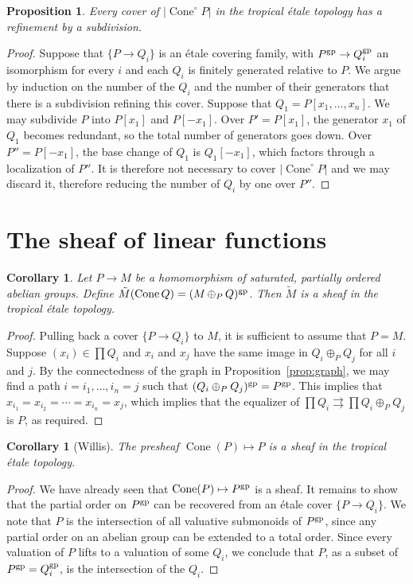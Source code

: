 \documentclass[12pt]{amsart}
\newtheorem{proposition}[theorem]{Proposition}
\newtheorem{corollary}[theorem]{Corollary}
\theoremstyle{definition}
\theoremstyle{remark}
\def\Cone{\operatorname{Cone}}
\begin{document}
\begin{proposition} \label{prop:refinement}
Every cover of $|\Cone^\circ P|$ in the tropical \'etale topology has a refinement by a subdivision.
\end{proposition}
\begin{proof}
Suppose that $\{ P \to Q_i \}$ is an \'etale covering family, with $P^{\rm gp} \to Q_i^{\rm gp}$ an isomorphism for every $i$ and each $Q_i$ is finitely generated relative to $P$.  We argue by induction on the number of the $Q_i$ and the number of their generators that there is a subdivision refining this cover.  Suppose that $Q_1 = P[x_1, \ldots, x_n]$.  We may subdivide $P$ into $P[x_1]$ and $P[-x_1]$.  Over $P' = P[x_1]$, the generator $x_1$ of $Q_1$ becomes redundant, so the total number of generators goes down.  Over $P'' = P[-x_1]$, the base change of $Q_1$ is $Q_1[-x_1]$, which factors through a localization of $P''$.  It is therefore not necessary to cover $|\Cone^\circ P|$ and we may discard it, therefore reducing the number of $Q_i$ by one over $P''$.
\end{proof}


\section{The sheaf of linear functions}

\begin{corollary}
Let $P \to M$ be a homomorphism of saturated, partially ordered abelian groups.  Define $\tilde M(\Cone Q) = (M \mathop\oplus_P Q)^{\rm gp}$.  Then $\tilde M$ is a sheaf in the tropical \'etale topology.
\end{corollary}
\begin{proof}
Pulling back a cover $\{ P \to Q_i \}$ to $M$, it is sufficient to assume that $P = M$.  Suppose $(x_i) \in \prod Q_i$ and $x_i$ and $x_j$ have the same image in $Q_i \oplus_P Q_j$ for all $i$ and $j$.  By the connectedness of the graph in Proposition~\ref{prop:graph}, we may find a path $i = i_1, \ldots, i_n = j$ such that $(Q_i \oplus_P Q_j)^{\rm gp} = P^{\rm gp}$.  This implies that $x_{i_1} = x_{i_2} = \cdots = x_{i_n} = x_j$, which implies that the equalizer of $\prod Q_i \rightrightarrows \prod Q_i \oplus_P Q_j$ is $P$, as required.
\end{proof}

\begin{corollary}[Willis] \label{cor:L-sheaf}
The presheaf $\Cone(P) \mapsto P$ is a sheaf in the tropical \'etale topology.
\end{corollary}
\begin{proof}
We have already seen that $\Cone(P) \mapsto P^{\rm gp}$ is a sheaf.  It remains to show that the partial order on $P^{\rm gp}$ can be recovered from an \'etale cover $\{ P \to Q_i \}$.  We note that $P$ is the intersection of all valuative submonoids of $P^{\rm gp}$, since any partial order on an abelian group can be extended to a total order.  Since every valuation of $P$ lifts to a valuation of some $Q_i$, we conclude that $P$, as a subset of $P^{\rm gp} = Q_i^{\rm gp}$, is the intersection of the $Q_i$.
\end{proof}
\end{document}
